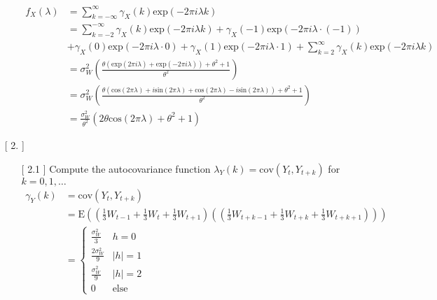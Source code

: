 \documentclass[10pt,a4paper]{article}
\begin{document}
\begin{enumerate}
\begin{enumerate}
			\begin{align*}
				f_X(\lambda) &= \sum_{k=-\infty}^{\infty} \gamma_{X}(k) \text{exp}(-2\pi i \lambda k) \\
				&= \sum_{k=-2}^{-\infty} \gamma_{X}(k) \text{exp}(-2\pi i \lambda k) + \gamma_{X}(-1) \text{exp}(-2\pi i \lambda \cdot (-1)) \\
				&+ \gamma_{X}(0) \text{exp}(-2\pi i \lambda \cdot 0) + \gamma_{X}(1) \text{exp}(-2\pi i \lambda \cdot 1) + \sum_{k=2}^{\infty} \gamma_{X}(k) \text{exp}(-2\pi i \lambda k) \\
				&=  \sigma_{W}^2 \left( \frac{\theta (\text{exp}(2\pi i \lambda) + \text{exp}(-2\pi i \lambda) ) + \theta^2 + 1}{\theta^2}\right) \\
				&=\sigma_{W}^2 \left( \frac{\theta (\text{cos}(2\pi  \lambda) + i\text{sin}(2\pi  \lambda) + \text{cos}(2\pi \lambda) - i\text{sin}(2\pi \lambda)) + \theta^2 + 1}{\theta^2}\right) \\
				&= \frac{\sigma_{W}^2}{\theta^2}(2\theta \text{cos}(2 \pi \lambda)+\theta^2 +1)
			\end{align*}
			
			\end{enumerate}
	
	\item[[ 2.]]  \begin{enumerate}
		\item[[ 2.1]] Compute the autocovariance function $\lambda_Y(k) = \text{cov}(Y_t,Y_{t+k})$ for $k=0,1,\dots$
		\begin{align*}
			\gamma_{Y}(k) &= \text{cov}(Y_t, Y_{t+k}) \\
			&= \text{E}((\frac{1}{3}W_{t-1} + \frac{1}{3}W_t + \frac{1}{3}W_{t+1})((\frac{1}{3}W_{t+k-1} + \frac{1}{3}W_{t+k}  + \frac{1}{3}W_{t+k+1}))) \\
			&=  	\left\{
					\begin{array}{ll}
						\frac{\sigma_{W}^2}{3} & h=0\\
						\frac{2 \sigma_{W}^2}{9} & |h| = 1\\
						\frac{\sigma_{W}^2}{9} & |h| = 2 \\
						0 & \text{else}
					\end{array}
					\right.	
		\end{align*}
		

\end{enumerate}
\end{enumerate}
\end{document}
